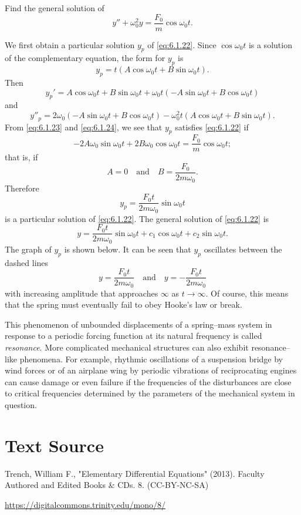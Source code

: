 \documentclass{ximera}
\begin{document}
 
 
\begin{example}\label{example:6.1.5}
Find the general solution of
\begin{equation}\label{eq:6.1.22}
y''+\omega_0^2y=\frac{F_0}{m}\cos\omega_0t.
\end{equation}
 
\begin{explanation}
We first obtain a particular solution $y_p$ of \eqref{eq:6.1.22}. Since
$\cos\omega_0t$ is a solution of the complementary equation, the form
for $y_p$ is
\begin{equation}\label{eq:6.1.23}
y_p=t(A\cos\omega_0t+B\sin\omega_0t).
\end{equation}
 Then
$$
y_p'=A\cos\omega_0t+B\sin\omega_0t
+\omega_0t(-A\sin\omega_0t+B\cos\omega_0t)
$$
and
\begin{equation}\label{eq:6.1.24}
y''_p=2\omega_0(-A\sin\omega_0t
+B\cos\omega_0t)-\omega_0^2t(A\cos\omega_0t+B\sin\omega_0t).
\end{equation}
From \eqref{eq:6.1.23} and \eqref{eq:6.1.24}, we see that $y_p$ satisfies
\eqref{eq:6.1.22} if
$$
-2A\omega_0\sin\omega_0t+2B\omega_0\cos\omega_0t=\frac{F_0}{m}
\cos\omega_0t;
$$
that is, if
$$
A=0\quad\mbox{and}\quad B=\frac{F_0}{2m\omega_0}.
$$
Therefore
$$
y_p=\frac{F_0t}{2m\omega_0}\sin\omega_0t
$$
is a particular solution of \eqref{eq:6.1.22}. The general solution of
 \eqref{eq:6.1.22} is
$$
y=\frac{F_0t}{2m\omega_0}\sin\omega_0t+c_1\cos\omega_0t+c_2\sin\omega_0t.
$$
The graph of $y_p$ is shown below.  It can be
seen that $y_p$ oscillates between the dashed lines
$$
y=\frac{F_0t}{2m\omega_0}\quad\mbox{and}\quad y=-\frac{F_0t}{2m\omega_0}
$$
with increasing amplitude that approaches $\infty$ as $t\rightarrow\infty$. Of
course, this means that the spring must eventually fail to obey Hooke's law
or break.

\begin{center}
\end{center}

\end{explanation}
\end{example}
 
 
 
This phenomenon of unbounded displacements of a spring--mass system in
response to a periodic forcing function at its natural
frequency is called \textit{resonance}. More complicated mechanical
structures can also exhibit resonance--like phenomena. For example,
rhythmic oscillations of a suspension bridge by wind forces or of an
airplane wing by periodic vibrations of reciprocating engines can
cause damage or even failure if the frequencies of the disturbances
are close to critical frequencies determined by the parameters of the
mechanical system in question.
 
\section*{Text Source}
Trench, William F., "Elementary Differential Equations" (2013). Faculty Authored and Edited Books \& CDs. 8. (CC-BY-NC-SA)
 
\href{https://digitalcommons.trinity.edu/mono/8/}{https://digitalcommons.trinity.edu/mono/8/}
 
\end{document}
